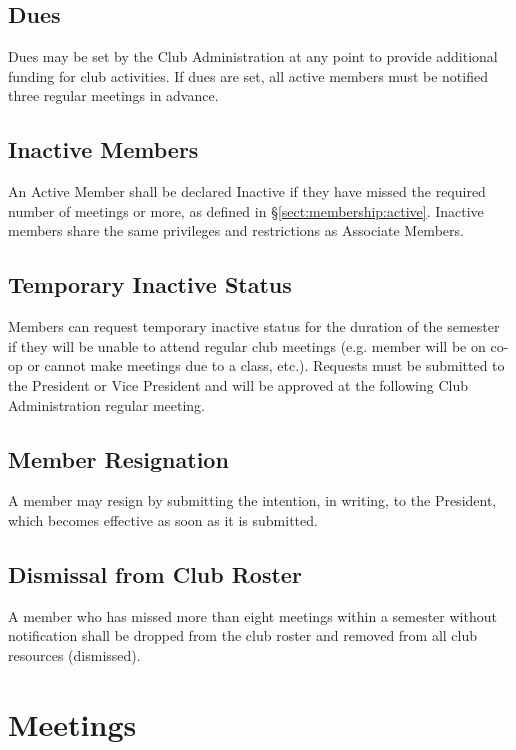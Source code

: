 \documentclass[english,11pt]{article}
\begin{document}
\subsection{Dues} \label{sect:membership:dues}
Dues may be set by the Club Administration at any point to provide additional funding for club activities.
If dues are set, all active members must be notified three regular meetings in advance.

\subsection{Inactive Members} \label{sect:membership:inactive}
An Active Member shall be declared Inactive if they have missed the required number of meetings or more, as defined in §\ref{sect:membership:active}.
Inactive members share the same privileges and restrictions as Associate Members.

\subsection{Temporary Inactive Status} \label{sect:membership:tmp-inactive}
Members can request temporary inactive status for the duration of the semester if they will be unable to attend regular club meetings (e.g. member will be on co-op or cannot make meetings due to a class, etc.).
Requests must be submitted to the President or Vice President and will be approved at the following Club Administration regular meeting.

\subsection{Member Resignation} \label{sect:membership:resignation}
A member may resign by submitting the intention, in writing, to the President, which becomes effective as soon as it is submitted.

\subsection{Dismissal from Club Roster} \label{sect:membership:dismissal}
A member who has missed more than eight meetings within a semester without notification shall be dropped from the club roster and removed from all club resources (dismissed).

\section{Meetings} \label{art:meetings}
\end{document}
